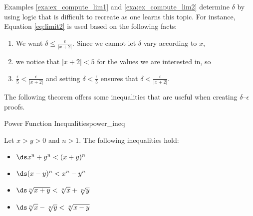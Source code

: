 Examples \ref{exa:ex_compute_lim1} and \ref{exa:ex_compute_lim2} determine $\delta$ by using logic that is difficult to recreate as one learns this topic. For instance, Equation \eqref{eq:limit2} is used based on the following facts:
	\begin{enumerate}
	\item		We want $\delta \leq \frac{\epsilon}{|x+2|}$. Since we cannot let $\delta$ vary according to $x$,
	\item		we notice that $|x+2|<5$ for the values we are interested in, so
	\item		$\frac{\epsilon}{5} < \frac{\epsilon}{|x+2|}$ and setting $\delta<\frac{\epsilon}{5}$ ensures that $\delta<\frac{\epsilon}{|x+2|}$.
	\end{enumerate}

The following theorem offers some inequalities that are useful when creating $\delta$--$\epsilon$ proofs.


\begin{theorem}{Power Function Inequalities}{power_ineq}
{Let $x>y>0$ and $n>1$. The following inequalities hold:
\begin{itemize}
\item		$\ds x^n+y^n < (x+y)^n$
\item		$\ds (x-y)^n < x^n - y^n$
\item		$\ds\sqrt[n]{x+y} < \sqrt[n]{x}+\sqrt[n]{y}$
\item		$\ds \sqrt[n]{x}-\sqrt[n]{y}<\sqrt[n]{x-y}$
\end{itemize}
}
\end{theorem}


